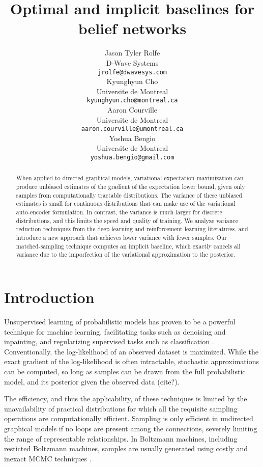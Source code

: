 \documentclass{article} %
\title{Optimal and implicit baselines for belief networks}
\author{
Jason Tyler Rolfe \\ %
D-Wave Systems \\
\texttt{jrolfe@dwavesys.com} \\
\And
Kyunghyun Cho \\
Universite de Montreal \\
\texttt{kyunghyun.cho@montreal.ca} \\
\AND
Aaron Courville \\
Universite de Montreal \\
\texttt{aaron.courville@umontreal.ca} \\
\And
Yoshua Bengio \\
Universite de Montreal \\
\texttt{yoshua.bengio@gmail.com} \\
}
\begin{document}
\maketitle

\begin{abstract}
When applied to directed graphical models, variational expectation maximization can produce unbiased estimates of the gradient of the expectation lower bound, given only samples from computationally tractable distributions.  The variance of these unbiased estimates is small for continuous distributions that can make use of the variational auto-encoder formulation.  In contrast, the variance is much larger for discrete distributions, and this limits the speed and quality of training.  We analyze variance reduction techniques from the deep learning and reinforcement learning literatures, and introduce a new approach that achieves lower variance with fewer samples.  Our matched-sampling technique computes an implicit baseline, which exactly cancels all variance due to the imporfection of the variational approximation to the posterior.  
\end{abstract}

\section{Introduction}


Unsupervised learning of probabilistic models has proven to be a powerful technique for machine learning, facilitating tasks such as denoising and inpainting, and regularizing supervised tasks such as classification \cite{hinton2006fast, salakhutdinov2009deep}.  Conventionally, the log-likelihood of an observed dataset is maximized. %
While the exact gradient of the log-likelihood is often intractable, stochastic approximations can be computed, so long as samples can be drawn from the full probabilistic model, and its posterior given the observed data (cite?).

The efficiency, and thus the applicability, of these techniques is limited by the unavailability of practical distributions for which all the requisite sampling operations are computationally efficient.  Sampling is only efficient in undirected graphical models if no loops are present among the connections, severely limiting the range of representable relationships.  In Boltzmann machines, including resticted Boltzmann machines, samples are usually generated using costly and inexact MCMC techniques \cite{hinton1983optimal}.  
\end{document}
